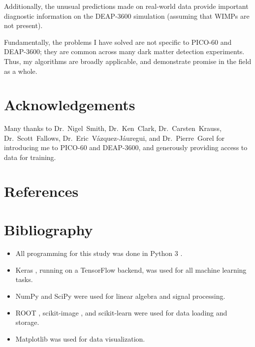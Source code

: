 \documentclass[12pt]{article}
\begin{document}
Additionally, the unusual predictions made on real-world data provide important diagnostic information on the DEAP-3600 simulation (assuming that WIMPs are not present).

Fundamentally, the problems I have solved are not specific to PICO-60 and DEAP-3600; they are common across many dark matter detection experiments. Thus, my algorithms are broadly applicable, and demonstrate promise in the field as a whole.

\section{Acknowledgements}

Many thanks to Dr.~Nigel~Smith, Dr.~Ken~Clark, Dr.~Carsten~Krauss, Dr.~Scott~Fallows, Dr.~Eric~V\'azquez-J\'auregui, and Dr.~Pierre~Gorel for introducing me to PICO-60 and DEAP-3600, and generously providing access to data for training.

\section{References}

\printbibliography[heading=none]

\pagebreak

\section{Bibliography}

\begin{itemize}
    \item All programming for this study was done in Python 3 \cite{python}.
    \item Keras \cite{keras}, running on a TensorFlow \cite{tensorflow} backend, was used for all machine learning tasks.
    \item NumPy \cite{numpy} and SciPy \cite{scipy} were used for linear algebra and signal processing.
    \item ROOT \cite{root}, scikit-image \cite{scikit-image}, and scikit-learn \cite{scikit-learn} were used for data loading and storage.
    \item Matplotlib \cite{matplotlib} was used for data visualization.
\end{itemize}
\end{document}
